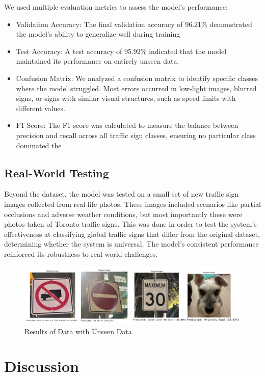 \documentclass{article} %
\begin{document}
We used multiple evaluation metrics to assess the model's performance:
\begin{itemize}
    \item Validation Accuracy: The final validation accuracy of 96.21\% demonstrated the model's ability to generalize well during training
    \item Test Accuracy: A test accuracy of 95.92\% indicated that the model maintained its performance on entirely unseen data.
    \item Confusion Matrix: We analyzed a confusion matrix to identify specific classes where the model struggled. Most errors occurred in low-light images, blurred signs, or signs with similar visual structures, such as speed limits with different values.
    \item F1 Score: The F1 score was calculated to measure the balance between precision and recall across all traffic sign classes, ensuring no particular class dominated the
    
\end{itemize}

\subsection{Real-World Testing}

Beyond the dataset, the model was tested on a small set of new traffic sign images collected from real-life photos. These images included scenarios like partial occlusions and adverse weather conditions, but most importantly these were photos taken of Toronto traffic signs. This was done in order to test the system's effectiveness at classifying global traffic signs that differ from the original dataset, determining whether the system is universal. The model's consistent performance reinforced its robustness to real-world challenges.
\newpage
\begin{figure}[h]
    \centering
    \includegraphics[width=0.5\linewidth]{classificationstext.png}
    \caption{Results of Data with Unseen Data}
    \label{fig:enter-label}
\end{figure}

\section{Discussion}
\end{document}

